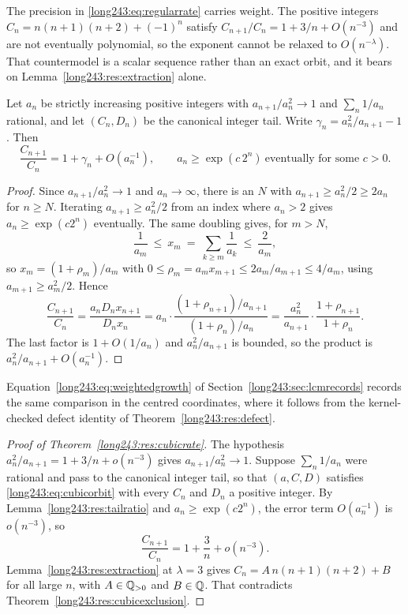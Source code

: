 \documentclass[11pt]{article}
\begin{document}
The precision in \eqref{long243:eq:regularrate} carries weight.  The positive integers
$C_n=n(n+1)(n+2)+(-1)^n$ satisfy $C_{n+1}/C_n=1+3/n+O(n^{-3})$ and are not
eventually polynomial, so the exponent cannot be relaxed to $O(n^{-\lambda})$.
That countermodel is a scalar sequence rather than an exact orbit, and it bears
on Lemma~\ref{long243:res:extraction} alone.

\begin{lemma}\label{long243:res:tailratio}
Let $a_n$ be strictly increasing positive integers with $a_{n+1}/a_n^2\to1$ and
$\sum_n1/a_n$ rational, and let $(C_n,D_n)$ be the canonical integer tail.
Write $\gamma_n=a_n^2/a_{n+1}-1$.  Then
\[
 \frac{C_{n+1}}{C_n}=1+\gamma_n+O(a_n^{-1}),
 \qquad a_n\ge\exp(c\,2^n)\ \text{eventually for some }c>0 .
\]
\end{lemma}

\begin{proof}
Since $a_{n+1}/a_n^2\to1$ and $a_n\to\infty$, there is an $N$ with
$a_{n+1}\ge a_n^2/2\ge2a_n$ for $n\ge N$.  Iterating $a_{n+1}\ge a_n^2/2$ from
an index where $a_n>2$ gives $a_n\ge\exp(c2^n)$ eventually.  The same doubling
gives, for $m>N$,
\[
 \frac1{a_m}\ \le\ x_m\ =\ \sum_{k\ge m}\frac1{a_k}\ \le\ \frac2{a_m},
\]
so $x_{m}=(1+\rho_{m})/a_{m}$ with
$0\le\rho_{m}=a_mx_{m+1}\le 2a_m/a_{m+1}\le4/a_m$, using
$a_{m+1}\ge a_m^2/2$.  Hence
\[
 \frac{C_{n+1}}{C_n}=\frac{a_nD_nx_{n+1}}{D_nx_n}
 =a_n\cdot\frac{(1+\rho_{n+1})/a_{n+1}}{(1+\rho_n)/a_n}
 =\frac{a_n^2}{a_{n+1}}\cdot\frac{1+\rho_{n+1}}{1+\rho_n}.
\]
The last factor is $1+O(1/a_n)$ and $a_n^2/a_{n+1}$ is bounded, so the product
is $a_n^2/a_{n+1}+O(a_n^{-1})$.
\end{proof}

\noindent Equation~\eqref{long243:eq:weightedgrowth} of Section~\ref{long243:sec:lcmrecords}
records the same comparison in the centred coordinates, where it follows from
the kernel-checked defect identity of Theorem~\ref{long243:res:defect}.

\begin{proof}[Proof of Theorem~\ref{long243:res:cubicrate}]
The hypothesis $a_n^2/a_{n+1}=1+3/n+o(n^{-3})$ gives $a_{n+1}/a_n^2\to1$.
Suppose $\sum_n1/a_n$ were rational and pass to the canonical integer tail, so
that $(a,C,D)$ satisfies \eqref{long243:eq:cubicorbit} with every $C_n$ and $D_n$ a
positive integer.  By Lemma~\ref{long243:res:tailratio} and $a_n\ge\exp(c2^n)$, the
error term $O(a_n^{-1})$ is $o(n^{-3})$, so
\[
 \frac{C_{n+1}}{C_n}=1+\frac3n+o(n^{-3}).
\]
Lemma~\ref{long243:res:extraction} at $\lambda=3$ gives
$C_n=A\,n(n+1)(n+2)+B$ for all large $n$, with $A\in\mathbb{Q}_{>0}$ and $B\in\mathbb{Q}$.
That contradicts Theorem~\ref{long243:res:cubicexclusion}.
\end{proof}
\end{document}
